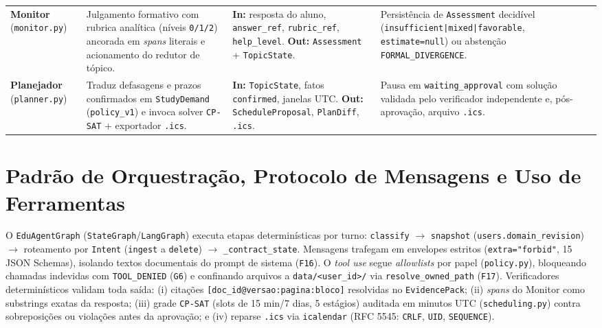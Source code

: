 \documentclass[12pt,a4paper]{article}
\newcommand{\code}[1]{\nolinkurl{#1}}
\begin{document}
\begin{table}[htbp]
\begin{tabular}{@{}L{2.2cm}L{4.3cm}L{4.5cm}L{4.1cm}@{}}
\textbf{Monitor} (\code{monitor.py}) & Julgamento formativo com rubrica analítica (níveis \code{0/1/2}) ancorada em \textit{spans} literais e acionamento do redutor de tópico. & \textbf{In:} resposta do aluno, \code{answer\_ref}, \code{rubric\_ref}, \code{help\_level}. \textbf{Out:} \code{Assessment} + \code{TopicState}. & Persistência de \code{Assessment} decidível (\code{insufficient|mixed|favorable}, \code{estimate=null}) ou abstenção \code{FORMAL\_DIVERGENCE}. \\
\textbf{Planejador} (\code{planner.py}) & Traduz defasagens e prazos confirmados em \code{StudyDemand} (\code{policy\_v1}) e invoca solver \code{CP-SAT} + exportador \code{.ics}. & \textbf{In:} \code{TopicState}, fatos \code{confirmed}, janelas UTC. \textbf{Out:} \code{ScheduleProposal}, \code{PlanDiff}, \code{.ics}. & Pausa em \code{waiting\_approval} com solução validada pelo verificador independente e, pós-aprovação, arquivo \code{.ics}. \\
\bottomrule
\end{tabular}
\end{table}

\section{Padrão de Orquestração, Protocolo de Mensagens e Uso de Ferramentas}
\label{sec:orquestracao-ferramentas}

O \code{EduAgentGraph} (\code{StateGraph}/\code{LangGraph}) executa etapas determinísticas por turno: \code{classify} $\rightarrow$ \code{snapshot} (\code{users.domain\_revision}) $\rightarrow$ roteamento por \code{Intent} (\code{ingest} a \code{delete}) $\rightarrow$ \code{\_contract\_state}. Mensagens trafegam em envelopes estritos (\code{extra="forbid"}, 15 JSON Schemas), isolando textos documentais do prompt de sistema (\code{F16}). O \textit{tool use} segue \textit{allowlists} por papel (\code{policy.py}), bloqueando chamadas indevidas com \code{TOOL\_DENIED} (\code{G6}) e confinando arquivos a \code{data/<user\_id>/} via \code{resolve\_owned\_path} (\code{F17}). Verificadores determinísticos validam toda saída: (i) citações \code{[doc\_id@versao:pagina:bloco]} resolvidas no \code{EvidencePack}; (ii) \textit{spans} do Monitor como substrings exatas da resposta; (iii) grade \code{CP-SAT} (slots de 15 min/7 dias, 5 estágios) auditada em minutos UTC (\code{scheduling.py}) contra sobreposições ou violações antes da aprovação; e (iv) reparse \code{.ics} via \code{icalendar} (RFC 5545: \code{CRLF}, \code{UID}, \code{SEQUENCE}).
\end{document}
